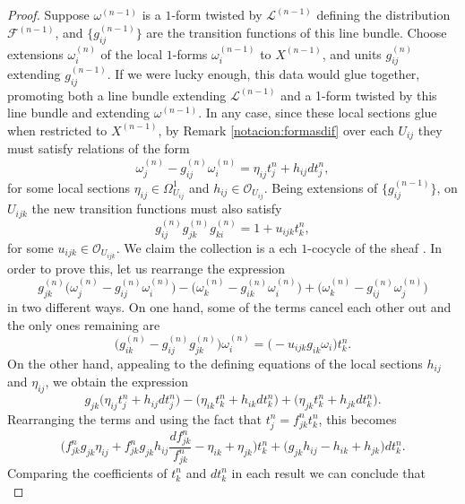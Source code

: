 \documentclass[10pt,a4paper]{amsart}
\newcommand{\F}{\mathscr{F}}
\newcommand{\OO}{\mathcal{O}}
\newcommand{\PP}{\mathcal{P}}
\renewcommand{\L}{\mathcal{L}}
\begin{document}
\begin{proof} Suppose $\omega^{(n-1)}$ is a $1$-form twisted by $\L^{(n-1)}$ defining the distribution $\F^{(n-1)}$, and $\big\{g_{ij}^{(n-1)}\big\}$ are the transition functions of this line bundle. Choose extensions $\omega_i^{(n)}$ of the local $1$-forms $\omega_i^{(n-1)}$ to $X^{(n-1)}$, and units $g_{ij}^{(n)}$ extending $g_{ij}^{(n-1)}$. If we were lucky enough, this data would glue together, promoting both a line bundle extending $\L^{(n-1)}$ and a 1-form twisted by this line bundle and extending $\omega^{(n-1)}$. In any case, since these local sections glue when restricted to $X^{(n-1)}$, by Remark \ref{notacion:formasdif} over each $U_{ij}$ they must satisfy relations of the form
\begin{equation}\label{Obstructions:eq1}
\omega^{(n)}_j - g_{ij}^{(n)}\omega_i^{(n)} = \eta_{ij} t_j^n+ h_{ij}dt_j^n,
\end{equation}
for some local sections $\eta_{ij}\in \Omega^1_{U_{ij}}$ and $h_{ij}\in \OO_{U_{ij}}$.
Being extensions of $\{g_{ij}^{(n-1)} \}$, on $U_{ijk}$ the new transition functions must also satisfy
\begin{equation}\label{Obstructions:eq2}
g_{ij}^{(n)}g_{jk}^{(n)}g_{ki}^{(n)} = 1 + u_{ijk}t_k^n,
\end{equation}
for some $u_{ijk}\in\OO_{U_{ijk}}$.
We claim the collection  is a ech $1$-cocycle of the sheaf \smash{$\PP_{\F,N_{X/Y}^{\otimes - n}}$}. In order to prove this, let us rearrange the expression 
\[
g_{jk}^{(n)}\big(\omega_j^{(n)}-g_{ij}^{(n)}\omega_i^{(n)}\big) - \big(\omega_k^{(n)}-g_{ik}^{(n)}\omega_i^{(n)}\big) + \big(\omega_k^{(n)}-g_{ij}^{(n)}\omega_j^{(n)}\big)
\]
in two different ways. On one hand, some of the terms cancel each other out and the only ones remaining are
\[
\Big(g_{ik}^{(n)} - g_{ij}^{(n)}g_{jk}^{(n)}\Big) \omega_i^{(n)} = \Big(-u_{ijk}g_{ik}\omega_i\Big)t_k^n.
\]
On the other hand, appealing to the defining equations of the local sections $h_{ij}$ and $\eta_{ij}$, we obtain the expression
\[
g_{jk}\big(\eta_{ij} t_j^n+ h_{ij}dt_j^n\big) - \big(\eta_{ik} t_k^n + h_{ik}dt_k^n\big) + \big(\eta_{jk} t_k^n + h_{jk}dt_k^n\big).
\]
Rearranging the terms and using the fact that $t_j^n=f_{jk}^nt_k^n$, this becomes
\[
\Bigg(f_{jk}^ng_{jk}\eta_{ij}+f_{jk}^ng_{jk}h_{ij}\frac{df_{jk}^n}{f_{jk}^n}-\eta_{ik}+\eta_{jk}\Bigg) t_k^n + \Big(g_{jk}h_{ij}-h_{ik}+h_{jk}\Big) dt_k^n.
\]
Comparing the coefficients of $t_k^n$ and $dt_k^n$ in each result we can conclude that
\begin{equation*}

\end{equation*}
\end{proof}
\end{document}
